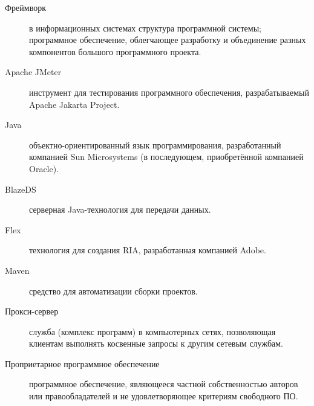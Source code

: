 \Defines
\begin{description}
\item[Фреймворк] в информационных системах структура программной системы; программное обеспечение, облегчающее
разработку и объединение разных компонентов большого программного проекта.
\item[Apache JMeter] инструмент для тестирования программного обеспечения, разрабатываемый Apache Jakarta Project.
\item[Java] объектно-ориентированный язык программирования, разработанный компанией Sun Microsystems
(в последующем, приобретённой компанией Oracle).
\item[BlazeDS] серверная Java-технология для передачи данных.
\item[Flex] технология для создания RIA, разработанная компанией Adobe.
\item[Maven] средство для автоматизации сборки проектов.
\item[Прокси-сервер] служба (комплекс программ) в компьютерных сетях, позволяющая клиентам выполнять косвенные
запросы к другим сетевым службам.
\item[Проприетарное программное обеспечение] программное обеспечение, являющееся частной собственностью авторов или
правообладателей и не удовлетворяющее критериям свободного ПО.
\end{description}
